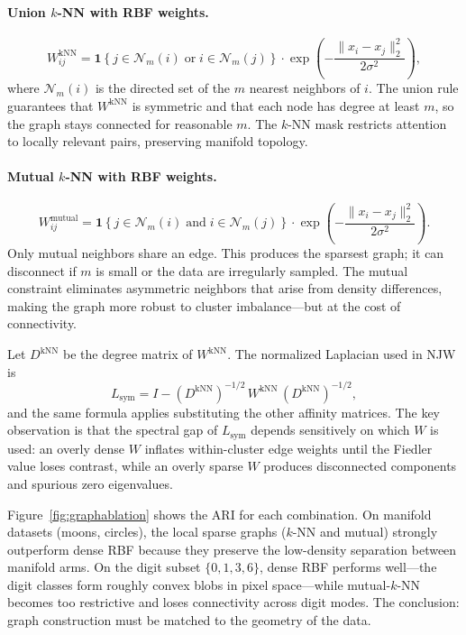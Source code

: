 \documentclass[11pt]{article}
\theoremstyle{plain}
\theoremstyle{definition}
\begin{document}
\paragraph{Union $k$-NN with RBF weights.}
\[
W_{ij}^{\mathrm{kNN}} = \mathbf{1}\!\left\{j\in \mathcal{N}_m(i) \;\text{or}\; i\in \mathcal{N}_m(j)\right\} \cdot \exp\!\left(-\frac{\lVert x_i-x_j\rVert_2^2}{2\sigma^2}\right),
\]
where $\mathcal{N}_m(i)$ is the directed set of the $m$ nearest neighbors of $i$. The union rule guarantees that $W^{\mathrm{kNN}}$ is symmetric and that each node has degree at least $m$, so the graph stays connected for reasonable $m$. The $k$-NN mask restricts attention to locally relevant pairs, preserving manifold topology.

\paragraph{Mutual $k$-NN with RBF weights.}
\[
W_{ij}^{\mathrm{mutual}} = \mathbf{1}\!\left\{j\in \mathcal{N}_m(i) \;\text{and}\; i\in \mathcal{N}_m(j)\right\} \cdot \exp\!\left(-\frac{\lVert x_i-x_j\rVert_2^2}{2\sigma^2}\right).
\]
Only mutual neighbors share an edge. This produces the sparsest graph; it can disconnect if $m$ is small or the data are irregularly sampled. The mutual constraint eliminates asymmetric neighbors that arise from density differences, making the graph more robust to cluster imbalance---but at the cost of connectivity.

\medskip
Let $D^{\mathrm{kNN}}$ be the degree matrix of $W^{\mathrm{kNN}}$. The normalized Laplacian used in NJW is
\[
L_{\mathrm{sym}} = I - (D^{\mathrm{kNN}})^{-1/2}\, W^{\mathrm{kNN}}\, (D^{\mathrm{kNN}})^{-1/2},
\]
and the same formula applies substituting the other affinity matrices. The key observation is that the spectral gap of $L_{\mathrm{sym}}$ depends sensitively on which $W$ is used: an overly dense $W$ inflates within-cluster edge weights until the Fiedler value loses contrast, while an overly sparse $W$ produces disconnected components and spurious zero eigenvalues.

Figure~\ref{fig:graphablation} shows the ARI for each combination. On manifold datasets (moons, circles), the local sparse graphs ($k$-NN and mutual) strongly outperform dense RBF because they preserve the low-density separation between manifold arms. On the digit subset $\{0,1,3,6\}$, dense RBF performs well---the digit classes form roughly convex blobs in pixel space---while mutual-$k$-NN becomes too restrictive and loses connectivity across digit modes. The conclusion: graph construction must be matched to the geometry of the data.
\end{document}

